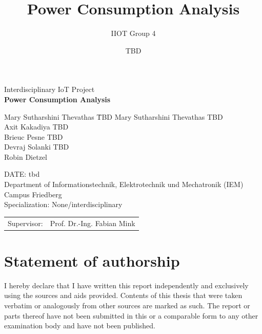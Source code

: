 \documentclass[11pt,a4paper,english]{article}
\author{IIOT Group 4}
\date{TBD} %
\title{Power Consumption Analysis}
\begin{document}

\thispagestyle{titlepage}

	\begin{center}
		\vspace{1cm}
		{\LARGE Interdisciplinary IoT Project}\\
		\vspace{2cm}
		{\huge\bfseries Power Consumption Analysis}\\
		\vspace{2cm}
		\begin{varwidth}{\linewidth}
			\begin{tabbing}
				Mary Sutharshini Thevathas \= TBD\kill
				Mary Sutharshini Thevathas \> TBD\\
				Axit Kakadiya \> TBD\\
				Brieuc Pesne \> TBD\\
				Devraj Solanki \> TBD\\
				Robin Dietzel \\
			\end{tabbing}
		\end{varwidth}
		
		\vspace{1cm}
		DATE: tbd\\%
		\vfill
		Department of Informationstechnik, Elektrotechnik und Mechatronik (IEM)\\
		Campus Friedberg\\
		\vspace{1cm}
		Specialization: None/interdisciplinary
	\end{center}

	\vspace{3cm}
	
	\begin{tabularx}{\linewidth}{ll}
		Supervisor: & Prof. Dr.-Ing. Fabian Mink
	\end{tabularx}
	
	\pagestyle{plain}
	
	\newpage
	\section*{Statement of authorship}
		I hereby declare that I have written this report independently and exclusively using the sources and aids provided.	Contents of this thesis that were taken verbatim or analogously from other sources are marked as such. The report or parts thereof have not been submitted in this or a comparable form to any other examination body and have not been published.\\
	
\end{document}
